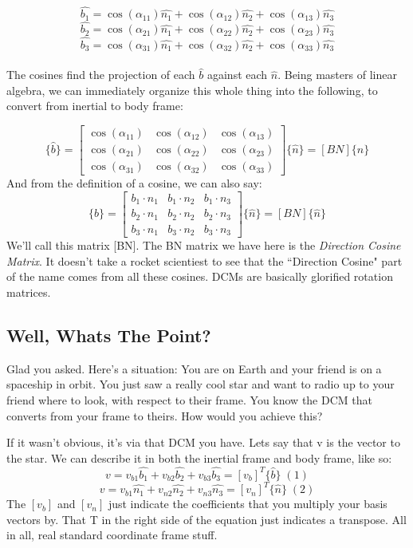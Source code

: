 \documentclass[a4paper,14pt]{extreport}
\newcommand{\bv}[1]{\hat{b_{#1}}}
\newcommand{\nv}[1]{\hat{n_{#1}}}
\begin{document}
\[\bv{1} = \cos(\alpha_{11})\nv{1} + \cos(\alpha_{12})\nv{2} + \cos(\alpha_{13})\nv{3}\]
\[\bv{2} = \cos(\alpha_{21})\nv{1} + \cos(\alpha_{22})\nv{2} + \cos(\alpha_{23})\nv{3}\]
\[\bv{3} = \cos(\alpha_{31})\nv{1} + \cos(\alpha_{32})\nv{2} + \cos(\alpha_{33})\nv{3}\]
\\
The cosines find the projection of each $\hat{b}$ against each $\hat{n}$. Being masters of linear algebra, we can immediately organize this whole thing into the following, to convert from inertial to body frame:

\[
\{\hat{b}\} = \begin{bmatrix}
\cos(\alpha_{11})&\cos(\alpha_{12})&\cos(\alpha_{13}) \\
\cos(\alpha_{21})&\cos(\alpha_{22})&\cos(\alpha_{23}) \\
\cos(\alpha_{31})&\cos(\alpha_{32})&\cos(\alpha_{33})
\end{bmatrix} \{\hat{n}\} = [BN] \{\hat{n}\}
\]
And from the definition of a cosine, we can also say:
\[
\{\hat{b}\} = \begin{bmatrix}
b_1 \cdot n_1 & b_1 \cdot n_2 & b_1 \cdot n_3 \\
b_2 \cdot n_1 & b_2 \cdot n_2 & b_2 \cdot n_3 \\
b_3 \cdot n_1 & b_3 \cdot n_2 & b_3 \cdot n_3
\end{bmatrix} \{\hat{n}\} = [BN] \{\hat{n}\}
\]
We'll call this matrix [BN]. The BN matrix we have here is the \emph{Direction Cosine Matrix}. It doesn't take a rocket scientiest to see that the ``Direction Cosine" part of the name comes from all these cosines. DCMs are basically glorified rotation matrices.

\subsection{Well, Whats The Point?}
Glad you asked. Here's a situation: You are on Earth and your friend is on a spaceship in orbit. You just saw a really cool star and want to radio up to your friend where to look, with respect to their frame. You know the DCM that converts from your frame to theirs. How would you achieve this?

If it wasn't obvious, it's via that DCM you have. Lets say that v is the vector to the star. We can describe it in both the inertial frame and body frame, like so:
\[v = v_{b1}\bv{1}+v_{b2}\bv{2}+v_{b3}\bv{3}=[v_b]^T\{\hat{b}\}\;(1)\]
\[v = v_{b1}\nv{1}+v_{n2}\nv{2}+v_{n3}\nv{3}=[v_n]^T\{\hat{n}\}\;(2)\]
The $[v_b]$ and $[v_n]$ just indicate the coefficients that you multiply your basis vectors by. That T in the right side of the equation just indicates a transpose. All in all, real standard coordinate frame stuff. 
\end{document}
